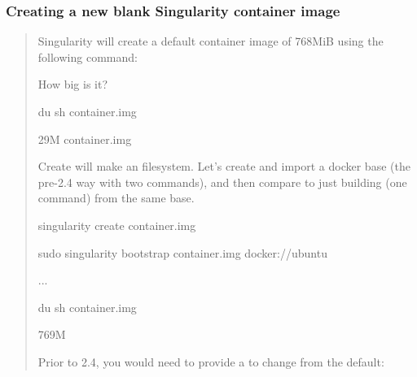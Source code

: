 \documentclass[letterpaper,10pt,english]{sphinxmanual}
\begin{document}
\subsubsection{Creating a new blank Singularity container image}
\label{\detokenize{appendix:creating-a-new-blank-singularity-container-image}}\begin{quote}

Singularity will create a default container image of 768MiB using the
following command:

%
\begin{sphinxVerbatim}[commandchars=\\\{\}]
  

     

     

   
\end{sphinxVerbatim}

How big is it?

%
\begin{sphinxVerbatim}[commandchars=\\\{\}]
\PYGZdl{} du \PYGZhy{}sh container.img

29M     container.img
\end{sphinxVerbatim}

Create will make an  filesystem. Let’s create and import a docker base
(the pre-2.4 way with two commands), and then compare to just building
(one command) from the same base.

%
\begin{sphinxVerbatim}[commandchars=\\\{\}]
singularity create container.img

sudo singularity bootstrap container.img docker://ubuntu


...


\PYGZdl{} du \PYGZhy{}sh container.img

769M
\end{sphinxVerbatim}

Prior to 2.4, you would need to provide a  to change from the default:


\end{quote}
\end{document}
